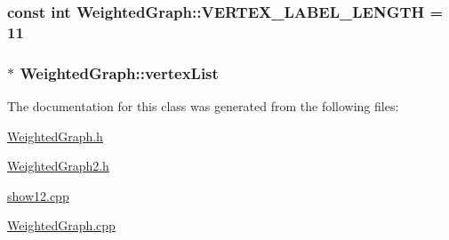 \hypertarget{class_weighted_graph_a19411776f4ee4e2a68bf2bc5e03aa10b}{
\subsubsection[{\-V\-E\-R\-T\-E\-X\-\_\-\-L\-A\-B\-E\-L\-\_\-\-L\-E\-N\-G\-T\-H}]{\setlength{\rightskip}{0pt plus 5cm}const int {\bf \-Weighted\-Graph\-::\-V\-E\-R\-T\-E\-X\-\_\-\-L\-A\-B\-E\-L\-\_\-\-L\-E\-N\-G\-T\-H} = 11}}\label{class_weighted_graph_a19411776f4ee4e2a68bf2bc5e03aa10b}
\hypertarget{class_weighted_graph_a2ad6c13bc100655ac45c6d97619bfb49}{
\subsubsection[{vertex\-List}]{ $\ast$ {\bf \-Weighted\-Graph\-::vertex\-List}}}\label{class_weighted_graph_a2ad6c13bc100655ac45c6d97619bfb49}


\-The documentation for this class was generated from the following files\-:\begin{DoxyCompactItemize}
\item 
\hyperlink{_weighted_graph_8h}{\-Weighted\-Graph.\-h}\item 
\hyperlink{_weighted_graph2_8h}{\-Weighted\-Graph2.\-h}\item 
\hyperlink{show12_8cpp}{show12.\-cpp}\item 
\hyperlink{_weighted_graph_8cpp}{\-Weighted\-Graph.\-cpp}\end{DoxyCompactItemize}
